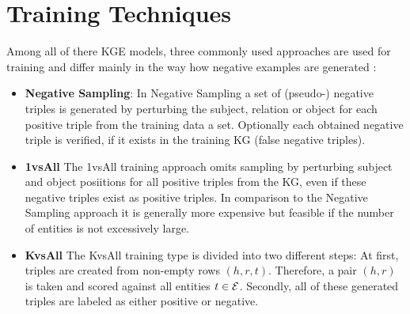 \section{Training Techniques}
\label{sec:training_techniques}

Among all of there \ac{KGE} models, three commonly used approaches are used for training and differ mainly in the way how negative examples are generated \cite{Ruffinelli2020You}:
\begin{itemize}
    \item  
    \textbf{Negative Sampling}:
    In Negative Sampling a set of (pseudo-) negative triples is generated by perturbing the subject, relation or object for each positive triple  from the training data a set.
    Optionally each obtained negative triple is verified, if it exists in the training \ac{KG} (false negative triples).
    
    \item  
    \textbf{1vsAll}
    The 1vsAll training approach omits sampling by perturbing subject and object posiitions for all positive triples from the \ac{KG}, even if these negative triples exist as positive triples.
    In comparison to the Negative Sampling approach it is generally more expensive but feasible if the number of entities is not excessively large.
        
    \item  
    \textbf{KvsAll} 
    The KvsAll training type is divided into two different steps:
    At first, triples are created from non-empty rows $(h,r,t)$.
    Therefore, a pair $(h,r)$ is taken and scored against all entities $t \in \mathcal{E}$.
    Secondly, all of these generated triples are labeled as either positive or negative.
\end{itemize}




